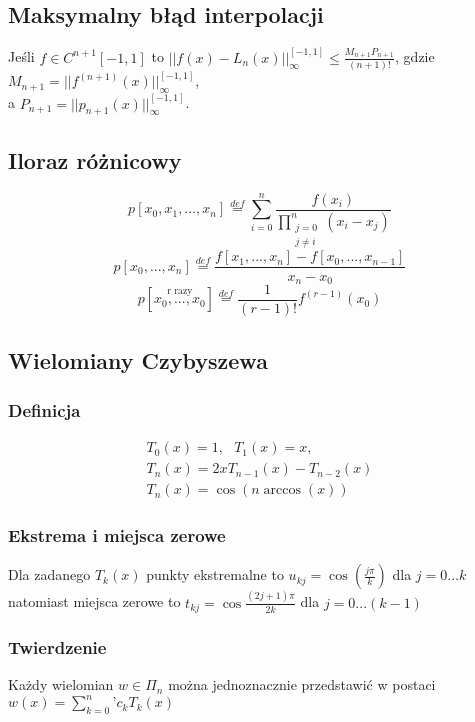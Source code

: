 \documentclass{article}
\begin{document}
\begin{minipage}[t]{.33\textwidth}
\subsection*{Maksymalny błąd interpolacji}
Jeśli $f \in C^{n+1}[-1,1]$ to $||f(x) - L_n(x) ||^{[-1,1]}_{\infty} \leq \frac{M_{n+1}P_{n+1}}{(n+1)!}$, gdzie $M_{n+1} = ||f^{(n+1)}(x)||^{[-1,1]}_{\infty}$, \\a $P_{n+1} = ||p_{n+1}(x)||^{[-1,1]}_{\infty}$.
\subsection*{Iloraz różnicowy}
\begin{equation*}
    p[x_0,x_1,\dotsc,x_n] \stackrel{def}{=} \sum_{i=0}^{n}\frac{f(x_i)}{\prod_{\substack{j=0 \\ j\neq i}}^{n} (x_i-x_j)} 
\end{equation*}
\begin{equation*}
    p[x_0,...,x_n] \stackrel{def}{=} \frac{f[x_1,...,x_n] - f[x_0,...,x_{n-1}]}{x_n - x_0}
\end{equation*}
\begin{equation*}
    p[\stackrel{\text{r razy}}{x_0,...,x_0}] \stackrel{def}{=} \frac{1}{(r-1)!} f^{(r-1)}(x_0)
\end{equation*}
\subsection*{Wielomiany Czybyszewa}
\subsubsection*{Definicja}
\begin{gather*}
    T_0(x) = 1,\text{ }T_1(x) = x, \\ T_n(x) = 2xT_{n-1}(x) - T_{n-2}(x)\\
    T_n(x) = \cos{(n \arccos{(x)})}
\end{gather*}
\subsubsection*{Ekstrema i miejsca zerowe}
Dla zadanego $T_k(x)$ punkty ekstremalne to $u_{kj} = \cos{(\frac{j\pi}{k})}$
dla $j = 0...k$ natomiast miejsca zerowe to $t_{kj} = \cos{\frac{(2j+1)\pi}{2k}}$ dla $j = 0...(k-1)$
\subsubsection*{Twierdzenie}
Każdy wielomian $w \in \Pi_n$ można jednoznacznie przedstawić w postaci 
$w(x) = \sum_{k=0}^{n}\textbf{'}c_kT_k(x)$ 

\end{minipage}
\end{document}
